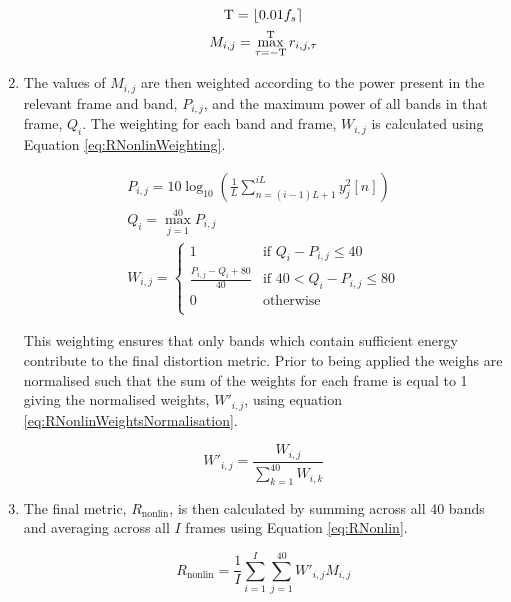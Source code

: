 \begin{enumerate}
					\begin{gather}
						\mathrm{T} = \left\lfloor0.01f_{s}\right\rceil \nonumber \\
						M_{i,j} = \max_{\tau = -\mathrm{T}}^{\mathrm{T}} r_{i,j,\tau}
						\label{eq:RNonlinMaxCrossCorrelation}
					\end{gather}

				\item The values of $M_{i,j}$ are then weighted according to the power present in the
					relevant frame and band, $P_{i,j}$, and the maximum power of all bands in that
					frame, $Q_{i}$. The weighting for each band and frame, $W_{i,j}$ is calculated
					using Equation \ref{eq:RNonlinWeighting}.

					\begin{gather}
						P_{i,j} = 10\log_{10} \left( \frac{1}{L} 
							\sum_{n=(i-1)L+1}^{iL} y_{j}^{2}[n]\right) \nonumber \\
						Q_{i} = \max_{j = 1}^{40} P_{i,j} \nonumber \\
						W_{i,j} = \begin{cases}
							1 & \text{if $Q_{i} - P_{i,j} \leq 40$} \\
							\frac{P_{i,j} - Q_{i} + 80}{40} & 
								\text{if $40 < Q_{i} - P_{i,j} \leq 80$} \\
							0 & \text{otherwise} \\
						\end{cases}
						\label{eq:RNonlinWeighting}
					\end{gather}

					This weighting ensures that only bands which contain sufficient energy contribute
					to the final distortion metric. Prior to being applied the weighs are normalised
					such that the sum of the weights for each frame is equal to 1 giving the normalised
					weights, $W'_{i,j}$, using equation \ref{eq:RNonlinWeightsNormalisation}.

					\begin{equation}
						W'_{i,j} = \frac{W_{i, j}}{\sum_{k = 1}^{40} W_{i,k}}
						\label{eq:RNonlinWeightsNormalisation}
					\end{equation}

				\item The final metric, $R_{\mathrm{nonlin}}$, is then calculated by summing across all 40
					bands and averaging across all $I$ frames using Equation \ref{eq:RNonlin}.

					\begin{equation}
						R_{\mathrm{nonlin}} = \frac{1}{I} \sum_{i = 1}^{I} \sum_{j = 1}^{40} 
									W'_{i,j}M_{i,j}
						\label{eq:RNonlin}
					\end{equation}

			\end{enumerate}

